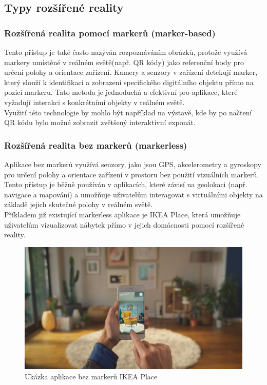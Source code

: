 \subsection{Typy rozšířené reality}
\subsubsection{Rozšířená realita pomocí markerů (marker-based)}
Tento přístup je také často nazýván rozpoznáváním obrázků, protože využívá markery umístěné v reálném světě(např. QR kódy) jako referenční body pro určení polohy a orientace zařízení. Kamery a senzory v zařízení detekují marker, který slouží k identifikaci a zobrazení specifického digitálního objektu přímo na pozici markeru. Tato metoda je jednoduchá a efektivní pro aplikace, které vyžadují interakci s konkrétními objekty v reálném světě. \cite  {AROverview} \\

Využití této technologie by mohlo být například na výstavě, kde by po načtení QR kódu bylo možné zobrazit zvětšený interaktivní exponát.
\subsubsection{Rozšířená realita bez markerů (markerless)}
Aplikace bez markerů využívá senzory, jako jsou GPS, akcelerometry a gyroskopy pro určení polohy a orientace zařízení v prostoru bez použití vizuálních markerů. Tento přístup je běžně používán v aplikacích, které závisí na geolokaci (např. navigace a mapování) a umožňuje uživatelům interagovat s virtuálními objekty na základě jejich skutečné polohy v reálném světě. \cite{AROverview} \\

Příkladem již existující markerless aplikace je IKEA Place, která umožňuje uživatelům vizualizovat nábytek přímo v jejich domácnosti pomocí rozšířené reality. \cite{IkeaPlace} \\
\begin{figure}[h]
    \centering
    \includegraphics[scale=0.2]{images/ikea}
    \caption{Ukázka aplikace bez markerů IKEA Place}
    \label{fig:ikea}
\end{figure}
\pagebreak
